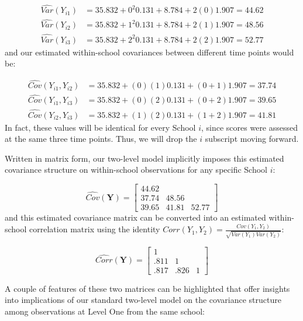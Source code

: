 \documentclass[
]{krantz}
\begin{document}
\begin{align*}
\hat{Var}(Y_{i1}) & = 35.832 + 0^{2} 0.131 + 8.784 + 2(0)1.907 = 44.62 \\
\hat{Var}(Y_{i2}) & = 35.832 + 1^{2} 0.131 + 8.784 + 2(1)1.907 = 48.56 \\
\hat{Var}(Y_{i3}) & = 35.832 + 2^{2} 0.131 + 8.784 + 2(2)1.907 = 52.77
\end{align*}
\noindent and our estimated within-school covariances between different time points would be:

\begin{align*}
\hat{Cov}(Y_{i1},Y_{i2}) & = 35.832 + (0)(1)0.131 + (0+1)1.907 = 37.74 \\
\hat{Cov}(Y_{i1},Y_{i3}) & = 35.832 + (0)(2)0.131 + (0+2)1.907 = 39.65 \\
\hat{Cov}(Y_{i2},Y_{i3}) & = 35.832 + (1)(2)0.131 + (1+2)1.907 = 41.81
\end{align*}
In fact, these values will be identical for every School \(i\), since scores were assessed at the same three time points. Thus, we will drop the \(i\) subscript moving forward.

Written in matrix form, our two-level model implicitly imposes this estimated covariance structure on within-school observations for any specific School \(i\):

\[ \hat{Cov}(\mathbf{Y}) =  \left[
          \begin{array}{cccc}
            44.62 & &   \\
            37.74 & 48.56 &  \\
            39.65 & 41.81 & 52.77
          \end{array} \right] \]
and this estimated covariance matrix can be converted into an estimated within-school correlation matrix using the identity \(Corr(Y_{1},Y_{2})=\frac{Cov(Y_{1},Y_{2})}{\sqrt{Var(Y_{1}) Var(Y_{2})}}\):

\[ \hat{Corr}(\mathbf{Y}) =  \left[
          \begin{array}{cccc}
            1 & &   \\
            .811 & 1 &  \\
            .817 & .826 & 1
          \end{array} \right] \]

A couple of features of these two matrices can be highlighted that offer insights into implications of our standard two-level model on the covariance structure among observations at Level One from the same school:
\end{document}
